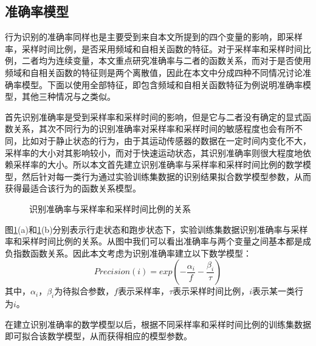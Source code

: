 \subsection{准确率模型}
\par 行为识别的准确率同样也是主要受到来自本文所提到的四个变量的影响，即采样率，采样时间比例，是否采用频域和自相关函数的特征。对于采样率和采样时间比例，二者均为连续变量，本文重点研究准确率与二者的函数关系，而对于是否使用频域和自相关函数的特征则是两个离散值，因此在本文中分成四种不同情况讨论准确率模型。下面以使用全部特征，即包含频域和自相关函数特征为例说明准确率模型，其他三种情况与之类似。
\par 首先识别准确率是受到采样率和采样时间的影响，但是它与二者没有确定的显式函数关系，其次不同行为的识别准确率对采样率和采样时间的敏感程度也会有所不同\cite{wang2009framework}，比如对于静止状态的行为，由于其运动传感器的数据在一定时间内变化不大，采样率的大小对其影响较小，而对于快速运动状态，其识别准确率则很大程度地依赖采样率的大小。所以本文首先建立识别准确率与采样率和采样时间比例的数学模型，然后针对每一类行为通过实验训练集数据的识别结果拟合数学模型参数，从而获得最适合该行为的函数关系模型。

\begin{figure}[!htb]
    \centering
    \caption{识别准确率与采样率和采样时间比例的关系}\label{precision}
\end{figure}

\par 图\ref{precision}(a)和\ref{precision}(b)分别表示行走状态和跑步状态下，实验训练集数据识别准确率与采样率和采样时间比例的关系。从图中我们可以看出准确率与两个变量之间基本都是成负指数函数关系。因此本文考虑为识别准确率建立以下数学模型：
\begin{equation}
	Precision(i) = exp(-\frac{\alpha_i}{f} - \frac{\beta_i}{\tau})
\end{equation}
其中，$\alpha_i$，$\beta_i$为待拟合参数，$f$表示采样率，$\tau$表示采样时间比例，$i$表示某一类行为$i$。
\par 在建立识别准确率的数学模型以后，根据不同采样率和采样时间比例的训练集数据即可拟合该数学模型，从而获得相应的模型参数。
